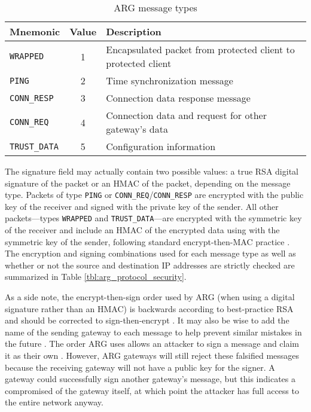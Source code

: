 \begin{table}
\caption{\ac{ARG} message types}
\label{tbl:arg_protocol_types}
\begin{tabular}{l|c|l}
\textbf{Mnemonic} & \textbf{Value} & \textbf{Description}\\
\hline
\texttt{WRAPPED} & 1 & Encapsulated packet from protected client to protected client\\
\texttt{PING} & 2 & Time synchronization message\\
\texttt{CONN\_RESP} & 3 & Connection data response message\\
\texttt{CONN\_REQ} & 4 & Connection data and request for other gateway's data\\ 
\texttt{TRUST\_DATA} & 5 & Configuration information 
\end{tabular}
\end{table}

\par The signature field may actually contain two possible values: a true \ac{RSA} digital signature of the packet or an \ac{HMAC} of the packet, depending on the message type. Packets of type \texttt{PING} or \texttt{CONN\_REQ}/\texttt{CONN\_RESP} are encrypted with the public key of the receiver and signed with the private key of the sender. All other packets---types \texttt{WRAPPED} and \texttt{TRUST\_DATA}---are encrypted with the symmetric key of the receiver and include an \ac{HMAC} of the encrypted data using with the symmetric key of the sender, following standard encrypt-then-MAC practice \cite{AuthEncryptThenMAC}. The encryption and signing combinations used for each message type as well as whether or not the source and destination \ac{IP} addresses are strictly checked are summarized in Table \ref{tbl:arg_protocol_security}.

\par As a side note, the encrypt-then-sign order used by \ac{ARG} (when using a digital signature rather than an \ac{HMAC}) is backwards according to best-practice \ac{RSA} and should be corrected to sign-then-encrypt \cite{RobustPrinciplesPK}. It may also be wise to add the name of the sending gateway to each message to help prevent similar mistakes in the future \cite{EngPricCrypto}. The order \ac{ARG} uses allows an attacker to sign a message and claim it as their own \cite{rfc2633}. However, \ac{ARG} gateways will still reject these falsified messages because the receiving gateway will not have a public key for the signer. A gateway could successfully sign another gateway's message, but this indicates a compromised of the gateway itself, at which point the attacker has full access to the entire network anyway.

